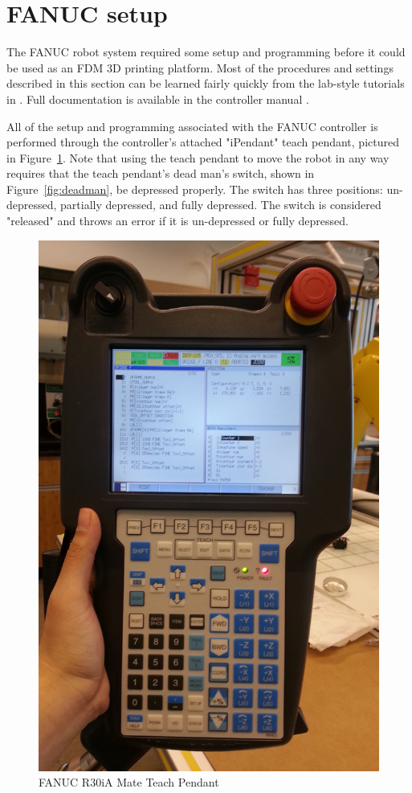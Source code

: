 \section{FANUC setup}
The FANUC robot system required some setup and programming before it could be used as an FDM 3D printing platform. Most of the procedures and settings described in this section can be learned fairly quickly from the lab-style tutorials in \cite{app-programming}. Full documentation is available in the controller manual \cite{lr-handling-tool}.

All of the setup and programming associated with the FANUC controller is performed through the controller's attached "iPendant" teach pendant, pictured in Figure~\ref{fig:teach-pendant}. Note that using the teach pendant to move the robot in any way requires that the teach pendant's dead man's switch, shown in Figure~\ref{fig:deadman}, be depressed properly. The switch has three positions: un-depressed, partially depressed, and fully depressed. The switch is considered "released" and throws an error if it is un-depressed or fully depressed.

\begin{figure}
    \centering
    \includegraphics[width=.5\linewidth]{figures/teach-pendant}
    \caption{FANUC R30iA Mate Teach Pendant}
    \label{fig:teach-pendant}
\end{figure}


